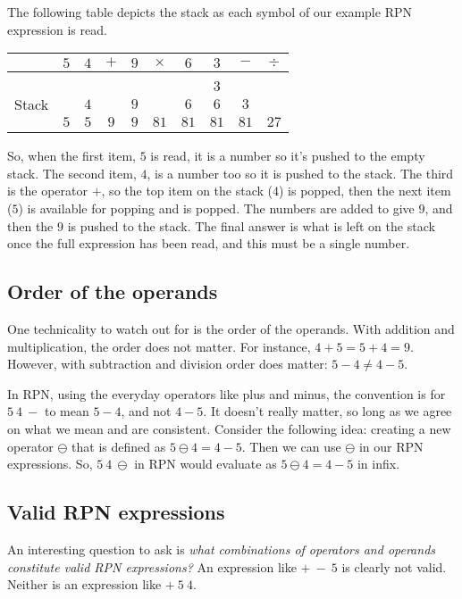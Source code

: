 \documentclass[twocolumn]{iagproc}
\begin{document}
The following table depicts the stack as each symbol of our example RPN expression is read.
\begin{center}
  \begin{tabular}[b]{lccccccccc}
    \toprule
    & $5$ & $4$ & $+$ & $9$ & $\times$ & $6$  & $3$  & $-$  & $\div$ \\
    \midrule \\
    \multirow{3}{6mm}[-2mm]{\begin{sideways}Stack\end{sideways}}
    & $ $ & $ $ & $ $ & $ $ &     $ $  & $ $  & $3$  & $ $  & $ $    \\
    & $ $ & $4$ & $ $ & $9$ &     $ $  & $6$  & $6$  & $3$  & $ $    \\
    & $5$ & $5$ & $9$ & $9$ &     $81$ & $81$ & $81$ & $81$ & $27$    \\
    \bottomrule
  \end{tabular}
\end{center}
So, when the first item, $5$ is read, it is a number so it's pushed to the empty stack.
The second item, $4$, is a number too so it is pushed to the stack.
The third is the operator $+$, so the top item on the stack ($4$) is popped, then the next item ($5$) is available for popping and is popped.
The numbers are added to give $9$, and then the $9$ is pushed to the stack.
The final answer is what is left on the stack once the full expression has been read, and this must be a single number.

\subsection*{Order of the operands}
One technicality to watch out for is the order of the operands.
With addition and multiplication, the order does not matter.
For instance, $4+5=5+4=9$.
However, with subtraction and division order does matter: $5-4 \neq 4-5$.

In RPN, using the everyday operators like plus and minus, the convention is for $5 \ 4 \ -$ to mean $5-4$, and not $4-5$.
It doesn't really matter, so long as we agree on what we mean and are consistent.
Consider the following idea: creating a new operator $\ominus$ that is defined as $5 \ominus 4 = 4 - 5$.
Then we can use $\ominus$ in our RPN expressions.
So, $5 \ 4 \ \ominus$ in RPN would evaluate as $5 \ominus 4 = 4 - 5$ in infix.

\subsection*{Valid RPN expressions}
An interesting question to ask is \emph{what combinations of operators and operands constitute valid RPN expressions?}
An expression like $+ \ - \ 5$ is clearly not valid.
Neither is an expression like $+ \ 5 \ 4$.
\end{document}
